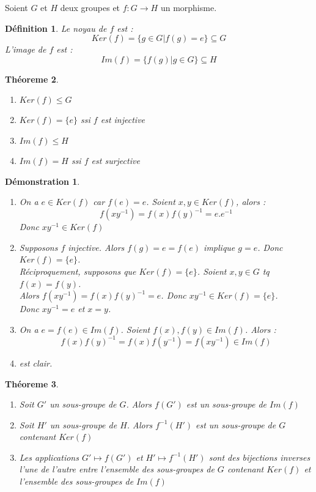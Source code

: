 \documentclass[a4paper, oneside]{report}
\theoremstyle{break}
\newtheorem{thm}{Théoreme}[section] %
\newtheorem{defi}[thm]{Définition}
\newtheorem*{demo}{Démonstration}
\begin{document}
Soient $G$ et $H$ deux groupes et $f:G\rightarrow H$ un morphisme.

\begin{defi}
	Le noyau de $f$ est :
	$$Ker(f)=\{g\in G | f(g) =e \} \subseteq G$$
	L'image de $f$ est :
	$$Im(f)=\{f(g)| g\in G\} \subseteq H$$
\end{defi}

\begin{thm}
	\begin{enumerate}
		\item $Ker(f)\leq G$
		\item $Ker(f)=\{e\}$ ssi $f$ est injective
		\item $Im(f)\leq H$
		\item $Im(f)=H$ ssi $f$ est surjective
	\end{enumerate}
\end{thm}

\begin{demo}
	\begin{enumerate}
		\item On a $e\in Ker(f)$ car $f(e)=e$. Soient $x,y\in Ker(f)$, alors :
		$$f(xy^{-1})=f(x)f(y)^{-1}=e.e^{-1}$$
		Donc $xy^{-1}\in Ker(f)$
		
		\item Supposons $f$ injective. Alors $f(g)=e=f(e)$ implique $g=e$. Donc $Ker(f)=\{e\}$.\\
		Réciproquement, supposons que $Ker(f)=\{e\}$. Soient $x,y\in G$ tq $f(x)=f(y)$.\\
		Alors $f(xy^{-1})=f(x)f(y)^{-1}=e$. Donc $xy^{-1}\in Ker(f)=\{ e \}$.\\
		Donc $xy^{-1}=e$ et $x=y$.
		
		\item On a $e=f(e)\in Im(f)$. Soient $f(x),f(y)\in Im(f)$. Alors :
		$$f(x)f(y)^{-1}=f(x)f(y^{-1})=f(xy^{-1})\in Im(f)$$
		
		\item est clair.
	\end{enumerate}	
\end{demo}

\begin{thm}
	\begin{enumerate}
		\item Soit $G'$ un sous-groupe de $G$. Alors $f(G')$ est un sous-groupe de $Im(f)$
		\item Soit $H'$ un sous-groupe de $H$. Alors $f^{-1}(H')$ est un sous-groupe de $G$ contenant $Ker(f)$
		\item Les applications $G'\mapsto f(G')$ et $H'\mapsto f^{-1}(H')$ sont des bijections inverses l'une de l'autre entre l'ensemble des sous-groupes de $G$ contenant $Ker(f)$ et l'ensemble des sous-groupes de $Im(f)$
	\end{enumerate}
\end{thm} 
\end{document}
